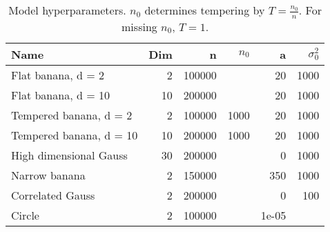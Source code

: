 \begin{table}
\centering
\caption{
            Model hyperparameters. $n_0$ determines tempering by \(T=\frac{n_0}{n}\).
            For missing $n_0$, \(T = 1\).
            }
\label{model_params_table}
\begin{tabular}{lrrrrr}
\toprule
                    Name &  Dim &       n &  $n_0$ &     a &  $\sigma^2_0$ \\
\midrule
      Flat banana, d = 2 &    2 &  100000 &        &    20 &          1000 \\
     Flat banana, d = 10 &   10 &  200000 &        &    20 &          1000 \\
  Tempered banana, d = 2 &    2 &  100000 &   1000 &    20 &          1000 \\
 Tempered banana, d = 10 &   10 &  200000 &   1000 &    20 &          1000 \\
  High dimensional Gauss &   30 &  200000 &        &     0 &          1000 \\
           Narrow banana &    2 &  150000 &        &   350 &          1000 \\
        Correlated Gauss &    2 &  200000 &        &     0 &           100 \\
                  Circle &    2 &  100000 &        & 1e-05 &               \\
\bottomrule
\end{tabular}
\end{table}
